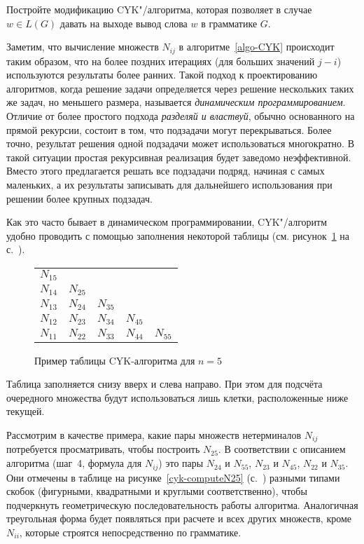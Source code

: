 \begin{myproblem} Постройте модификацию CYK"/алгоритма, которая позволяет в случае $w \in
L(G)$ давать на выходе вывод слова $w$ в грамматике $G$.
\end{myproblem}

\begin{myremark}
Заметим, что вычисление множеств $N_{ij}$ в алгоритме~\ref{algo-CYK} происходит
таким образом, что на более поздних итерациях (для больших значений $j-i$)
используются результаты более ранних. Такой подход к проектированию алгоритмов,
когда решение задачи определяется через решение нескольких таких же задач,
но меньшего размера,
называется \emph{динамическим программированием}. Отличие от более простого
подхода \emph{разделяй и властвуй}, обычно основанного на прямой рекурсии,
состоит в том, что подзадачи могут перекрываться. Более точно, результат
решения одной подзадачи может использоваться многократно. В такой ситуации
простая рекурсивная реализация будет заведомо неэффективной. Вместо этого
предлагается решать все подзадачи подряд, начиная с самых маленьких, а их
результаты записывать для дальнейшего использования при решении более
крупных подзадач.
\end{myremark}

Как это часто бывает в динамическом программировании, CYK"/алгоритм
удобно проводить с помощью заполнения некоторой таблицы
(см. рисунок~\ref{tab-cyk} на с.~\pageref{tab-cyk}).

\begin{figure}
\begin{center}
\begin{tabular}{|ccccc}
$N_{15}$ & & & &\\
$N_{14}$ & $N_{25}$ & & &\\
$N_{13}$ & $N_{24}$ & $N_{35}$ & &\\
$N_{12}$ & $N_{23}$ & $N_{34}$ & $N_{45}$ &\\
$N_{11}$ & $N_{22}$ & $N_{33}$ & $N_{44}$ & $N_{55}$\\
\hline
\end{tabular}
\end{center}
\caption{Пример таблицы CYK-алгоритма для $n=5$}
\label{tab-cyk}
\end{figure}

\noindent Таблица заполняется снизу вверх и
слева направо. При этом для подсчёта очередного множества будут
использоваться лишь клетки, расположенные ниже текущей.

Рассмотрим в качестве примера, какие пары множеств нетерминалов 
$N_{ij}$ потребуется просматривать, чтобы построить $N_{25}$. В 
соответствии с описанием алгоритма (шаг~4, формула для $N_{ij}$) это 
пары $N_{24}$ и $N_{55}$, $N_{23}$ и $N_{45}$,  $N_{22}$ и $N_{35}$. 
Они отмечены в таблице на рисунке~\ref{cyk-computeN25} 
(с.~\pageref{cyk-computeN25}) разными типами скобок (фигурными, 
квадратными и круглыми соответственно), чтобы подчеркнуть 
геометрическую последовательность работы алгоритма. Аналогичная 
треугольная форма будет появляться при расчете и всех других множеств, 
кроме $N_{ii}$, которые строятся непосредственно по грамматике.

